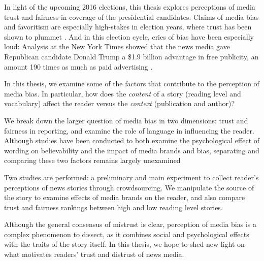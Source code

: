 In light of the upcoming 2016 elections, this thesis explores perceptions of media trust and fairness in coverage of the presidential candidates. Claims of media bias and favoritism are especially high-stakes in election years, where trust has been shown to plummet \cite{Gallup-trust-2015}. And in this election cycle, cries of bias have been especially loud: Analysis at the New York Times showed that the news media gave Republican candidate Donald Trump a \$1.9 billion advantage in free publicity, an amount 190 times as much as paid advertising \cite{Trump-advantage}.

In this thesis, we examine some of the factors that contribute to the perception of media bias. In particular, how does the \emph{content} of a story (reading level and vocabulary) affect the reader versus the \emph{context} (publication and author)? 

We break down the larger question of media bias in two dimensions: trust and fairness in reporting, and examine the role of language in influencing the reader.  Although studies have been conducted to both examine the psychological effect of wording on believability and the impact of media brands and bias, separating and comparing these two factors remains largely unexamined \cite{weisberg2008seductive, baum2008eye}

Two studies are performed: a preliminary and main experiment to collect reader's perceptions of news stories through crowdsourcing. We manipulate the source of the story to examine effects of media brands on the reader, and also compare trust and fairness rankings between high and low reading level stories.

Although the general consensus of mistrust is clear, perception of media bias is a complex phenomenon to dissect, as it combines social and psychological effects with the traits of the story itself. In this thesis, we hope to shed new light on what motivates readers' trust and distrust of news media.



 
 

